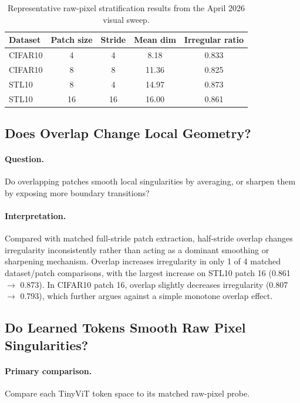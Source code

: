 \documentclass{article}
\newcommand{\dataset}[1]{\textsc{#1}}
\theoremstyle{definition}
\theoremstyle{plain}
\theoremstyle{remark}
\begin{document}
\begin{table}[H]
\centering
\caption{Representative raw-pixel stratification results from the April 2026 visual sweep.}
\begin{tabular}{lcccc}
\toprule
Dataset & Patch size & Stride & Mean dim & Irregular ratio \\
\midrule
CIFAR10 & 4 & 4 & 8.18 & 0.833 \\
CIFAR10 & 8 & 8 & 11.36 & 0.825 \\
STL10 & 8 & 4 & 14.97 & 0.873 \\
STL10 & 16 & 16 & 16.00 & 0.861 \\
\bottomrule
\end{tabular}
\label{tab:raw-pixel-results}
\end{table}

\subsection{Does Overlap Change Local Geometry?}
\paragraph{Question.}
Do overlapping patches smooth local singularities by averaging, or sharpen them by exposing more boundary transitions?

\paragraph{Interpretation.}
Compared with matched full-stride patch extraction, half-stride overlap changes irregularity inconsistently rather than acting as a dominant smoothing or sharpening mechanism. Overlap increases irregularity in only 1 of 4 matched dataset/patch comparisons, with the largest increase on \dataset{STL10} patch 16 (0.861 $\rightarrow$ 0.873). In \dataset{CIFAR10} patch 16, overlap slightly decreases irregularity (0.807 $\rightarrow$ 0.793), which further argues against a simple monotone overlap effect.

\subsection{Do Learned Tokens Smooth Raw Pixel Singularities?}
\paragraph{Primary comparison.}
Compare each TinyViT token space to its matched raw-pixel probe.
\end{document}
